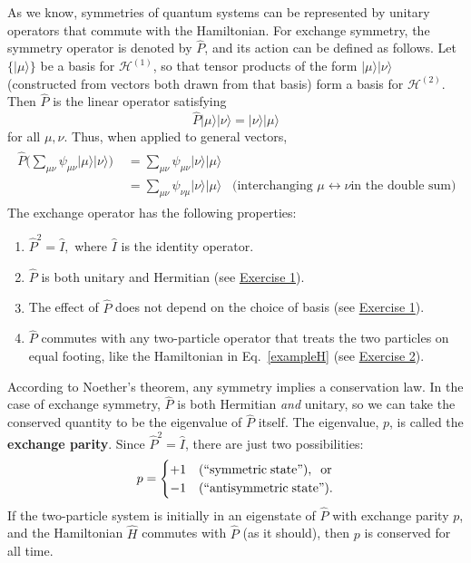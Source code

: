 \documentclass[prx,12pt]{revtex4-2}
\begin{document}
As we know, symmetries of quantum systems can be represented by
unitary operators that commute with the Hamiltonian.  For exchange
symmetry, the symmetry operator is denoted by $\hat{P}$, and its
action can be defined as follows.  Let $\{|\mu\rangle\}$ be a basis
for $\mathscr{H}^{(1)}$, so that tensor products of the form
$|\mu\rangle |\nu\rangle$ (constructed from vectors both drawn from
that basis) form a basis for $\mathscr{H}^{(2)}$.  Then $\hat{P}$ is
the linear operator satisfying
\begin{equation}
  \hat{P} |\mu\rangle |\nu\rangle = |\nu\rangle|\mu\rangle
\end{equation}
for all $\mu, \nu$.  Thus, when applied to general vectors,
\begin{align}
  \begin{aligned}\hat{P} \Big (\sum_{\mu\nu}
    \psi_{\mu\nu} |\mu\rangle|\nu\rangle \Big)
    \;&=  \sum_{\mu\nu} \psi_{\mu\nu} |\nu\rangle|\mu\rangle \\
    &= \sum_{\mu\nu} \psi_{\nu\mu} |\nu\rangle|\mu\rangle
    \;\;\;\textrm{(interchanging $\mu\leftrightarrow \nu$
      in the double sum)}\end{aligned}
\end{align}
The exchange operator has the following properties:
\begin{enumerate}
\item $\hat{P}^2 = \hat{I},$ where $\hat{I}$ is the identity operator.

\item $\hat{P}$ is both unitary and Hermitian (see
  \hyperref[ex:1]{Exercise 1}).
  
\item The effect of $\hat{P}$ does not depend on the choice
  of basis (see \hyperref[ex:1]{Exercise 1}).

\item $\hat{P}$ commutes with any two-particle operator that treats
  the two particles on equal footing, like the Hamiltonian in
  Eq.~\eqref{exampleH} (see \hyperref[ex:2]{Exercise 2}).
\end{enumerate}

According to Noether's theorem, any symmetry implies a conservation
law.  In the case of exchange symmetry, $\hat{P}$ is both Hermitian
\textit{and} unitary, so we can take the conserved quantity to be the
eigenvalue of $\hat{P}$ itself.  The eigenvalue, $p$, is called the
\textbf{exchange parity}.  Since $\hat{P}^2 = \hat{I}$, there are just
two possibilities:
\begin{equation}
  p = \begin{cases}+1 & \textrm{(``symmetric\;state'')}, \;\;\textrm{or} \\ -1 & \textrm{(``antisymmetric\;state'').}\end{cases}
\end{equation}
If the two-particle system is initially in an eigenstate of $\hat{P}$
with exchange parity $p$, and the Hamiltonian $\hat{H}$ commutes with
$\hat{P}$ (as it should), then $p$ is conserved for all time.
\end{document}
